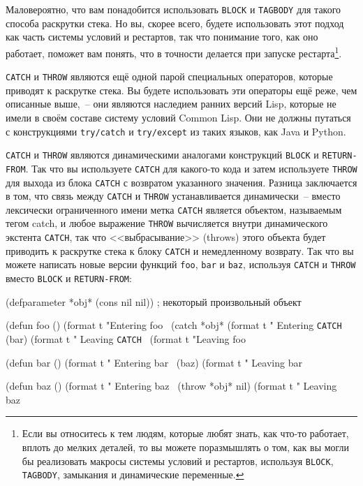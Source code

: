 Маловероятно, что вам понадобится использовать \lstinline{BLOCK} и \lstinline{TAGBODY} для такого
способа раскрутки стека.  Но вы, скорее всего, будете использовать этот подход как часть
системы условий и рестартов, так что понимание того, как оно работает, поможет вам понять,
что в точности делается при запуске рестарта\footnote{Если вы относитесь к тем людям,
  которые любят знать, как что-то работает, вплоть до мелких деталей, то вы можете
  поразмышлять о том, как вы могли бы реализовать макросы системы условий и рестартов,
  используя \lstinline{BLOCK}, \lstinline{TAGBODY}, замыкания и динамические переменные.}\hspace{\footnotenegspace}.

\lstinline{CATCH} и \lstinline{THROW} являются ещё одной парой специальных операторов, которые
приводят к раскрутке стека.  Вы будете использовать эти операторы ещё реже, чем описанные
выше,~-- они являются наследием ранних версий Lisp, которые не имели в своём составе
систему условий Common Lisp.  Они не должны путаться с конструкциями \lstinline{try/catch} и
\lstinline{try/except} из таких языков, как Java и Python.

\lstinline{CATCH} и \lstinline{THROW} являются динамическими аналогами конструкций \lstinline{BLOCK} и
\lstinline{RETURN-FROM}.  Так что вы используете \lstinline{CATCH} для какого-то кода и затем
используете \lstinline{THROW} для выхода из блока \lstinline{CATCH} с возвратом указанного значения.
Разница заключается в том, что связь между \lstinline{CATCH} и \lstinline{THROW} устанавливается
динамически~-- вместо лексически ограниченного имени метка \lstinline{CATCH} является
объектом, называемым тегом catch, и любое выражение \lstinline{THROW} вычисляется внутри
динамического экстента \lstinline{CATCH}, так что <<выбрасывание>> (throws) этого объекта будет
приводить к раскрутке стека к блоку \lstinline{CATCH} и немедленному возврату.  Так
что вы можете написать новые версии функций \lstinline{foo}, \lstinline{bar} и \lstinline{baz}, используя
\lstinline{CATCH} и \lstinline{THROW} вместо \lstinline{BLOCK} и \lstinline{RETURN-FROM}:

\begin{myverb}
(defparameter *obj* (cons nil nil)) ; некоторый произвольный объект

(defun foo ()
  (format t "Entering foo~%
  (catch *obj*
    (format t " Entering \lstinline{CATCH}~%
    (bar)
    (format t " Leaving \lstinline{CATCH}~%
  (format t "Leaving foo~%

(defun bar ()
  (format t "  Entering bar~%
  (baz)
  (format t "  Leaving bar~%

(defun baz ()
  (format t "   Entering baz~%
  (throw *obj* nil)
  (format t "   Leaving baz~%
\end{myverb}

